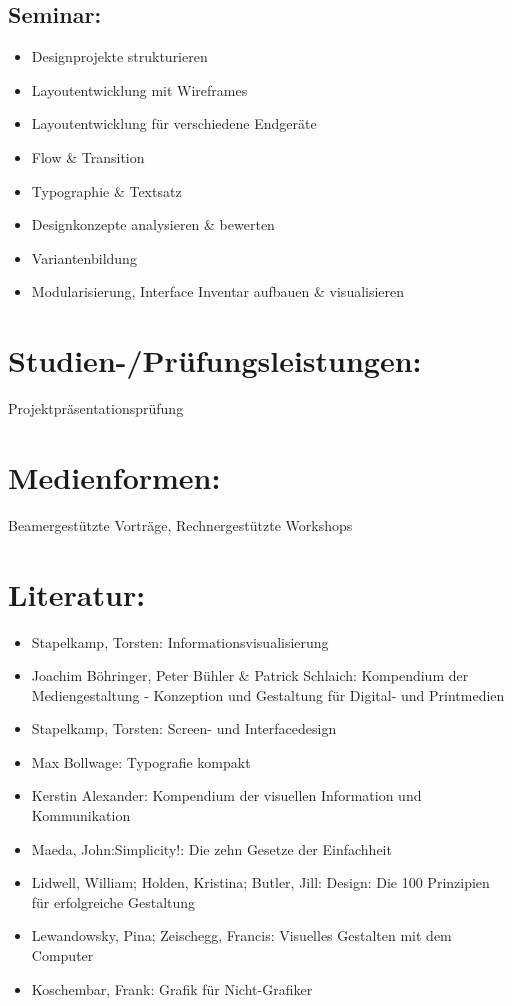\subsection{Seminar:}\label{seminar}

\begin{itemize}
\tightlist
\item
  Designprojekte strukturieren
\item
  Layoutentwicklung mit Wireframes
\item
  Layoutentwicklung für verschiedene Endgeräte
\item
  Flow \& Transition
\item
  Typographie \& Textsatz
\item
  Designkonzepte analysieren \& bewerten
\item
  Variantenbildung
\item
  Modularisierung, Interface Inventar aufbauen \& visualisieren
\end{itemize}

\section{Studien-/Prüfungsleistungen:}\label{studien-pruxfcfungsleistungen-25}

Projektpräsentationsprüfung

\section{Medienformen:}\label{medienformen-25}

Beamergestützte Vorträge, Rechnergestützte Workshops

\section{Literatur:}\label{literatur-25}

\begin{itemize}
\tightlist
\item
  Stapelkamp, Torsten: Informationsvisualisierung
\item
  Joachim Böhringer, Peter Bühler \& Patrick Schlaich: Kompendium der
  Mediengestaltung - Konzeption und Gestaltung für Digital- und
  Printmedien
\item
  Stapelkamp, Torsten: Screen- und Interfacedesign
\item
  Max Bollwage: Typografie kompakt
\item
  Kerstin Alexander: Kompendium der visuellen Information und
  Kommunikation
\item
  Maeda, John:Simplicity!: Die zehn Gesetze der Einfachheit
\item
  Lidwell, William; Holden, Kristina; Butler, Jill: Design: Die 100
  Prinzipien für erfolgreiche Gestaltung
\item
  Lewandowsky, Pina; Zeischegg, Francis: Visuelles Gestalten mit dem
  Computer
\item
  Koschembar, Frank: Grafik für Nicht-Grafiker
\end{itemize}

